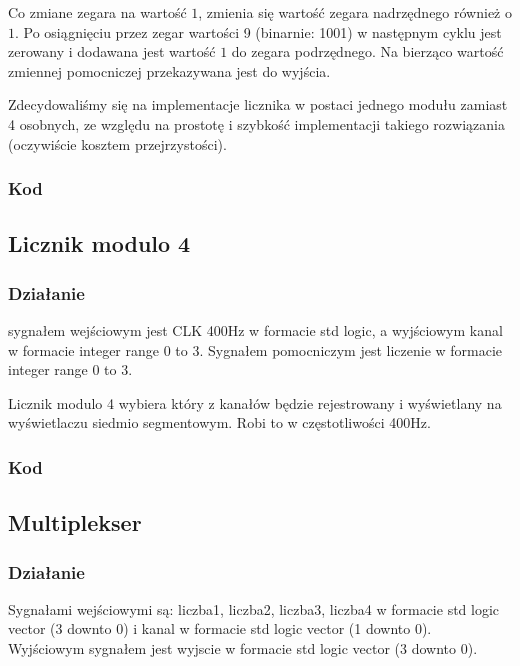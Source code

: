 \vspace*{0.2cm}

\hspace*{0.5cm}Co zmiane zegara na wartość $1$, zmienia się wartość zegara nadrzędnego również o $1$. Po osiągnięciu przez zegar wartości 9 (binarnie: 1001) w następnym cyklu jest zerowany i dodawana jest wartość $1$ do zegara podrzędnego. Na bierząco wartość zmiennej pomocniczej przekazywana jest do wyjścia.

\vspace*{0.5cm}

\hspace*{0.5cm}Zdecydowaliśmy się na implementacje licznika w postaci jednego modułu zamiast 4 osobnych, ze względu na prostotę i szybkość implementacji takiego rozwiązania (oczywiście kosztem przejrzystości).
\subsubsection{Kod}


\subsection{Licznik modulo 4}
\subsubsection{Działanie}
\hspace*{0.5cm}sygnałem wejściowym jest CLK 400Hz w formacie std logic, a wyjściowym kanal w formacie integer range 0 to 3. Sygnałem pomocniczym jest liczenie w formacie integer range 0 to 3.

\vspace*{0.5cm}

\hspace*{0.5cm}Licznik modulo 4 wybiera który z kanałów będzie rejestrowany i wyświetlany na wyświetlaczu siedmio segmentowym. Robi to w częstotliwości 400Hz. 
\subsubsection{Kod}


\subsection{Multiplekser}
\subsubsection{Działanie}
\hspace*{0.5cm}Sygnałami wejściowymi są: liczba1, liczba2, liczba3, liczba4 w formacie std logic vector (3 downto 0) i kanal w formacie std logic vector (1 downto 0). Wyjściowym sygnałem jest wyjscie w formacie std logic vector (3 downto 0).

